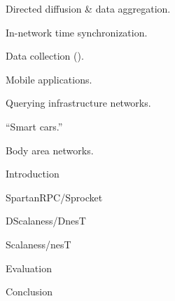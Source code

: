 
\begin{citemize}
  \item Directed diffusion \& data aggregation.
  \item In-network time synchronization.
  \item Data collection ().
  \item Mobile applications.
  \begin{citemize}
    \item Querying infrastructure networks.
    \item ``Smart cars.''
    \item Body area networks.
  \end{citemize}
\end{citemize}
\stopslide



\begin{cenumerate}
\item Introduction
\item {}
\item SpartanRPC/Sprocket
\item DScalaness/DnesT
\item Scalaness/nesT
\item Evaluation
\item Conclusion
\end{cenumerate}
\stopslide


